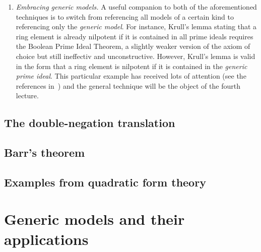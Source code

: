 \documentclass[10pt,reqno,a4paper,openany]{amsbook}
\theoremstyle{definition}
\theoremstyle{plain}
\theoremstyle{remark}
\newcommand{\?}{\,{:}\,}
\renewcommand{\_}{\mathpunct{.}\,}
\begin{document}
\begin{enumerate}
\item \emph{Embracing generic models.} A useful companion to both of the
aforementioned techniques is to switch from referencing all models of a certain
kind to referencing only the \emph{generic model}. For instance, Krull's lemma
stating that a ring element is already nilpotent if it is contained in all
prime ideals requires the Boolean Prime Ideal Theorem, a slightly weaker
version of the axiom of choice but still ineffectiv and unconstructive.
However, Krull's lemma is valid in the form that a ring element is nilpotent if
it is contained in the \emph{generic prime ideal}. This particular example has
received lots of attention (see the references
in~\cite{blechschmidt-schuster:constructive-maximal-ideals}) and the general
technique will be the object of the fourth lecture.
\end{enumerate}


\section{The double-negation translation}

\section{Barr's theorem}

\section{Examples from quadratic form theory}


\chapter{Generic models and their applications}
\end{document}
